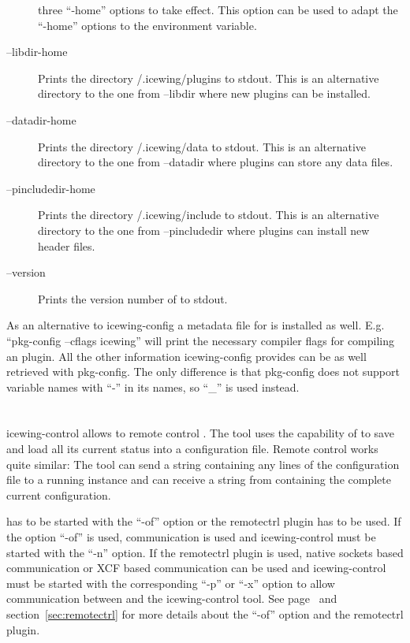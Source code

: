 \begin{description}
  three ``-home'' options to take effect. This option can be used to
  adapt the ``-home'' options to the 
  environment variable.
\item[--libdir-home] Prints the directory
  \urltilde{}/.icewing/plugins to stdout. This is an alternative
  directory to the one from --libdir where new plugins can be
  installed.
\item[--datadir-home] Prints the directory \urltilde{}/.icewing/data
  to stdout. This is an alternative directory to the one from
  --datadir where plugins can store any data files.
\item[--pincludedir-home] Prints the directory
  \urltilde{}/.icewing/include to stdout. This is an alternative
  directory to the one from --pincludedir where plugins can install
  new header files.
\item[--version] Prints the version number of \icewing{} to stdout.
\end{description}

As an alternative to icewing-config a metadata file for
 is installed as well. E.g. ``pkg-config --cflags
icewing'' will print the necessary compiler flags for compiling an
\icewing{} plugin. All the other information icewing-config provides
can be as well retrieved with pkg-config. The only difference is
that pkg-config does not support variable names with ``-'' in its
names, so ``\_'' is used instead.

\section{}
\label{sec:icewing-control}

icewing-control allows to remote control \icewing{}. The tool uses
the capability of \icewing{} to save and load all its current status
into a configuration file. Remote control works quite similar: The
tool can send a string containing any lines of the \icewing{}
configuration file to a running \icewing{} instance and can receive
a string from \icewing{} containing the complete current
configuration.

\icewing{} has to be started with the ``-of'' option or the
remotectrl plugin has to be used. If the option ``-of'' is used,
\dacs{} communication is used and icewing-control must be started
with the ``-n'' option. If the remotectrl plugin is used, native
sockets based communication or XCF based communication can be used
and icewing-control must be started with the corresponding ``-p'' or
``-x'' option to allow communication between \icewing{} and the
icewing-control tool. See page~ and
section~\ref{sec:remotectrl} for more details about the ``-of''
option and the remotectrl plugin.

